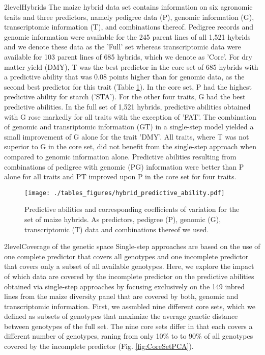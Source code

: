 \documentclass[12pt,titlepage]{article}
\begin{document}
\Genetics2level{Hybrids}
The maize hybrid data set contains information on six agronomic traits and
three predictors, namely pedigree data (P), genomic information (G), 
transcriptomic information (T), and combinations thereof.
Pedigree records and genomic information were available for the 245 parent 
lines of all 1,521 hybrids and we denote these data as the 'Full' set whereas
transcriptomic data were available for 103 parent lines of 685 hybrids, which
we denote as 'Core'.
For dry matter yield (DMY), T was the best predictor in the core set of 685 
hybrids with a predictive ability that was 0.08 points higher than for genomic 
data, as the second best predictor for this trait 
(Table \ref{fig:HybridResults}).
In the core set, P had the highest predictive ability for starch ('STA').
For the other four traits, G had the best predictive abilities.
In the full set of 1,521 hybrids, predictive abilities obtained with G rose 
markedly for all traits with the exception of 'FAT'.
The combination of genomic and transriptomic information (GT) in a single-step
model yielded a small improvement of G alone for the trait 'DMY'.
All traits, where T was not superior to G in the core set, did not benefit from 
the single-step approach when compared to genomic information alone.
Predictive abilities resulting from combinations of pedigree with genomic (PG)
information were better than P alone for all traits and PT improved upon P in
the core set for four traits.

\begin{figure}[H]
\centering
  \texttt{[image: ./tables\_figures/hybrid\_predictive\_ability.pdf]}
  \caption{
    Predictive abilities and corresponding coefficients of variation for the 
    set of maize hybrids.
    As predictors, pedigree (P), genomic (G), transcriptomic (T) data and 
    combinations thereof we used.
  } 
  \label{fig:HybridResults}
\end{figure}





\Genetics2level{Coverage of the genetic space}
Single-step approaches are based on the use of one complete predictor that
covers all genotypes and one incomplete predictor that covers only a subset of
all available genotypes.
Here, we explore the impact of which data are covered by the incomplete 
predictor on the predictive abilities obtained via single-step approaches by
focusing exclusively on the 149 inbred lines from the maize diversity panel
that are covered by both, genomic and transcriptomic information.
First, we assmbled nine different core sets, which we defined as subsets
of genotypes that maximize the average genetic distance between genotypes of
the full set.
The nine core sets differ in that each covers a different number of genotypes,
raning from only 10\% to to 90\% of all genotypes covered by the incomplete
predictor (Fig. \ref{fig:CoreSetPCA}).
\end{document}
